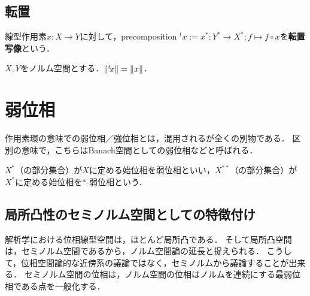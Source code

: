 \documentclass[uplatex,dvipdfmx]{jsreport}
\begin{document}
\subsection{転置}

\begin{definition}[transpose]
    線型作用素$x:X\to Y$に対して，precomposition ${}^t\!x:=x^*:Y^*\to X^*;f\mapsto f\circ x$を\textbf{転置写像}という．
\end{definition}

\begin{lemma}
    $X,Y$をノルム空間とする．$\|{}^t\!x\|=\|x\|$．
\end{lemma}

\section{弱位相}

\begin{tcolorbox}[colframe=ForestGreen, colback=ForestGreen!10!white,breakable,colbacktitle=ForestGreen!40!white,coltitle=black,fonttitle=\bfseries\sffamily,
title=]
    作用素環の意味での弱位相／強位相とは，混用されるが全くの別物である．
    区別の意味で，こちらはBanach空間としての弱位相などと呼ばれる．

    $X^*$（の部分集合）が$X$に定める始位相を弱位相といい，$X^{**}$（の部分集合）が$X^*$に定める始位相を$*$-弱位相という．
\end{tcolorbox}

\subsection{局所凸性のセミノルム空間としての特徴付け}

\begin{tcolorbox}[colframe=ForestGreen, colback=ForestGreen!10!white,breakable,colbacktitle=ForestGreen!40!white,coltitle=black,fonttitle=\bfseries\sffamily,
title=]
    解析学における位相線型空間は，ほとんど局所凸である．
    そして局所凸空間は，セミノルム空間であるから，ノルム空間論の延長と捉えられる．
    こうして，位相空間論的な近傍系の議論ではなく，セミノルムから議論することが出来る．
    セミノルム空間の位相は，ノルム空間の位相はノルムを連続にする最弱位相である点を一般化する．
\end{tcolorbox}
\end{document}
